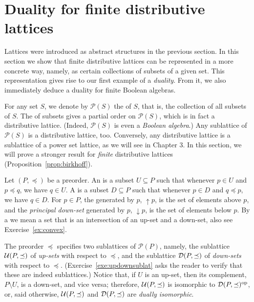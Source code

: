 \section{Duality for finite distributive lattices}\label{sec:finDLduality}
Lattices were introduced as abstract structures in the previous section. In this section we show that finite distributive lattices can be represented in a more concrete way, namely, as certain collections of subsets of a given set. %
This representation gives rise to our first example of a \emph{duality}. From it, we also immediately deduce a duality for finite Boolean algebras.

For any set $S$, we denote by $\mathcal{P}(S)$ the  of $S$, that is, the collection of all subsets of $S$. The  of subsets gives a partial order on $\mathcal{P}(S)$, which is in fact a distributive lattice. (Indeed, $\mathcal{P}(S)$ is even a \emph{Boolean algebra}.) Any sublattice of $\mathcal{P}(S)$ is a distributive lattice, too. Conversely, any distributive lattice is a sublattice of a power set lattice, as we will see in Chapter 3. %
In this section, we will prove a stronger result for \emph{finite} distributive lattices (Proposition~\ref{prop:birkhoff}).

Let $(P,\preceq)$ be a preorder. An  is a subset $U \subseteq P$ such that whenever $p \in U$ and $p \preceq q$, we have $q \in U$. A  is a subset $D \subseteq P$ such that whenever $p \in D$ and $q \preceq p$, we have $q \in D$. For $p \in P$, the  generated by $p$, ${\uparrow} p$, is the set of elements above $p$, and the \emph{principal down-set} generated by $p$, ${\downarrow} p$, is the set of elements below $p$. By a  we mean a set that is an intersection of an up-set and a down-set, also see Exercise~\ref{ex:convex}.

The preorder $\preceq$ specifies two sublattices of $\mathcal{P}(P)$, namely, the sublattice $\mathcal{U}(P,\preceq)$ of \emph{up-sets} with respect to $\preceq$, and the sublattice $\mathcal{D}(P, \preceq)$ of \emph{down-sets} with respect to $\preceq$. (Exercise~\ref{exe:updownsublat} asks the reader to verify that these are indeed sublattices.) Notice that, if $U$ is an up-set, then its complement, $P \setminus U$, is a down-set, and vice versa; therefore, $\mathcal{U}(P,\preceq)$ is isomorphic to $\mathcal{D}(P,\preceq)^{\mathrm{op}}$, or, said otherwise, $\mathcal{U}(P,\preceq)$ and $\mathcal{D}(P,\preceq)$ are \emph{dually isomorphic}. 

